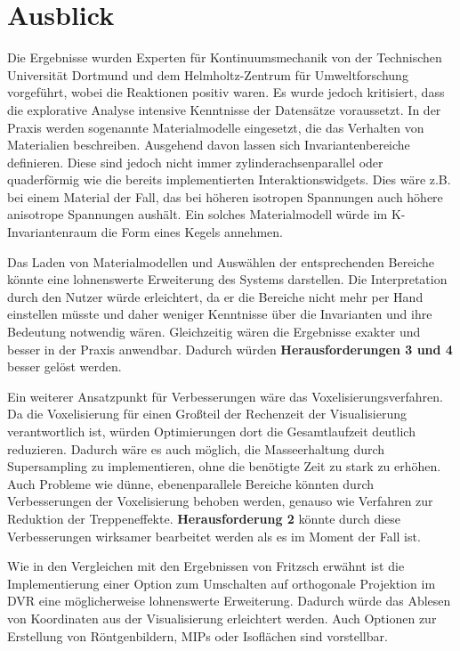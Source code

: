 \documentclass[a4paper,fontsize=12pt,toc=bib,parskip=half,ngerman]{scrartcl}
\begin{document}
\section{Ausblick}
\label{sec:Ausblick}
Die Ergebnisse wurden Experten f\"ur Kontinuumsmechanik von der Technischen Universit\"at Dortmund und dem Helmholtz-Zentrum f\"ur Umweltforschung vorgef\"uhrt, wobei die Reaktionen positiv waren. Es wurde jedoch kritisiert, dass die explorative Analyse intensive Kenntnisse der Datens\"atze voraussetzt. In der Praxis werden sogenannte Materialmodelle eingesetzt, die das Verhalten von Materialien beschreiben. Ausgehend davon lassen sich Invariantenbereiche definieren. Diese sind jedoch nicht immer zylinderachsenparallel oder quaderf\"ormig wie die bereits implementierten Interaktionswidgets. Dies w\"are z.B. bei einem Material der Fall, das bei h\"oheren isotropen Spannungen auch h\"ohere anisotrope Spannungen aush\"alt. Ein solches Materialmodell w\"urde im K-Invariantenraum die Form eines Kegels annehmen. 

Das Laden von Materialmodellen und Ausw\"ahlen der entsprechenden Bereiche k\"onnte eine lohnenswerte Erweiterung des Systems darstellen. Die Interpretation durch den Nutzer w\"urde erleichtert, da er die Bereiche nicht mehr per Hand einstellen m\"usste und daher weniger Kenntnisse \"uber die Invarianten und ihre Bedeutung notwendig w\"aren. Gleichzeitig w\"aren die Ergebnisse exakter und besser in der Praxis anwendbar. Dadurch w\"urden \textbf{Herausforderungen 3 und 4} besser gel\"ost werden. 

Ein weiterer Ansatzpunkt f\"ur Verbesserungen w\"are das Voxelisierungsverfahren. Da die Voxelisierung f\"ur einen Gro{\ss}teil der Rechenzeit der Visualisierung verantwortlich ist, w\"urden Optimierungen dort die Gesamtlaufzeit deutlich reduzieren. Dadurch w\"are es auch m\"oglich, die Masseerhaltung durch Supersampling zu implementieren, ohne die ben\"otigte Zeit zu stark zu erh\"ohen. Auch Probleme wie d\"unne, ebenenparallele Bereiche k\"onnten durch Verbesserungen der Voxelisierung behoben werden, genauso wie Verfahren zur Reduktion der Treppeneffekte. \textbf{Herausforderung 2} k\"onnte durch diese Verbesserungen wirksamer bearbeitet werden als es im Moment der Fall ist.

Wie in den Vergleichen mit den Ergebnissen von Fritzsch erw\"ahnt ist die Implementierung einer Option zum Umschalten auf orthogonale Projektion im DVR eine m\"oglicherweise lohnenswerte Erweiterung. Dadurch w\"urde das Ablesen von Koordinaten aus der Visualisierung erleichtert werden. Auch Optionen zur Erstellung von R\"ontgenbildern, MIPs oder Isofl\"achen sind vorstellbar.
\end{document}
